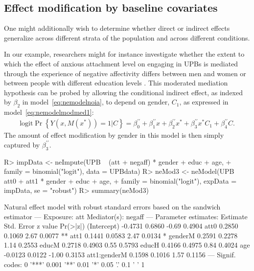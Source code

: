 \documentclass[nojss]{jss}
\begin{document}
\subsection{Effect modification by baseline covariates}
One might additionally wish to determine whether direct or indirect effects generalize across different strata of the population and across different conditions.
\par In our example, researchers might for instance investigate whether the extent to which the effect of anxious attachment level on engaging in UPBs is mediated through the experience of negative affectivity differs between men and women or between people with different education levels \citep{Muller2005, Preacher2007}. This moderated mediation hypothesis can be probed by allowing the conditional indirect effect, as indexed by $\beta_2$ in model~\eqref{eq:nemodelnoia}, to depend on gender, $C_1$, as expressed in model~\eqref{eq:nemodelmodmed1}:
\begin{align}\label{eq:nemodelmodmed1}
\mbox{logit} \Pr\left\{Y(x,M(x^*))=1|C\right\} = \beta_0^{\prime\prime} + \beta_1^{\prime\prime} x + \beta_2^{\prime\prime} x^* + \beta_3^{\prime\prime} x^* C_1 + \beta_4^{\prime\prime} C.
\end{align}
The amount of effect modification by gender in this model is then simply captured by $\beta^{\prime\prime}_3$.
\begin{Schunk}
\begin{Sinput}
R> impData <- neImpute(UPB ~ (att + negaff) * gender + educ + age,
+    family = binomial("logit"), data = UPBdata)
R> neMod3 <- neModel(UPB ~ att0 + att1 * gender + educ + age,
+    family = binomial("logit"), expData = impData, se = "robust")
R> summary(neMod3)
\end{Sinput}
\begin{Soutput}
Natural effect model
with robust standard errors based on the sandwich estimator
---
Exposure: att 
Mediator(s): negaff 
---
Parameter estimates:
             Estimate Std. Error z value Pr(>|z|)   
(Intercept)   -0.4731     0.6860   -0.69   0.4904   
att0           0.2850     0.1069    2.67   0.0077 **
att1           0.1441     0.0583    2.47   0.0134 * 
genderM        0.2591     0.2278    1.14   0.2553   
educM          0.2718     0.4903    0.55   0.5793   
educH          0.4166     0.4975    0.84   0.4024   
age           -0.0123     0.0122   -1.00   0.3153   
att1:genderM   0.1598     0.1016    1.57   0.1156   
---
Signif. codes:  0 '***' 0.001 '**' 0.01 '*' 0.05 '.' 0.1 ' ' 1
\end{Soutput}
\end{Schunk}
\end{document}
